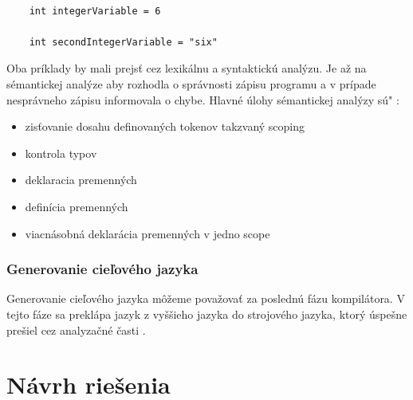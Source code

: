 \begin{lstlisting}

	int integerVariable = 6

	int secondIntegerVariable = "six"
\end{lstlisting}

Oba príklady by mali prejsť cez lexikálnu a syntaktickú analýzu. Je až na sémantickej analýze aby rozhodla o správnosti zápisu programu a v prípade nesprávneho zápisu informovala o chybe.  Hlavné úlohy sémantickej analýzy sú" :

\begin{itemize}
	\item zisťovanie dosahu definovaných tokenov takzvaný scoping
	\item kontrola typov
	\item deklaracia premenných
	\item definícia premenných
	\item viacnásobná deklarácia premenných v jedno scope
\end{itemize}

\subsubsection{Generovanie cieľového jazyka}
\indent Generovanie cieľového jazyka môžeme považovať za poslednú fázu kompilátora. V tejto fáze sa preklápa jazyk z vyššieho jazyka do strojového jazyka, ktorý úspešne prešiel cez analyzačné časti .\cite{gram}

\section{Návrh riešenia}
